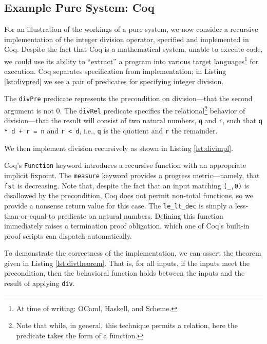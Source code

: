 \subsection{Example Pure System: Coq\label{sec:exPure}}
For an illustration of the workings of a pure system, we now  consider a recursive implementation of the integer division operator, specified and implemented in Coq.  Despite the fact that Coq is a mathematical system, unable to execute code, we could use its ability to ``extract'' a program into various target languages\footnote{At time of writing: OCaml, Haskell, and Scheme.} for execution.  Coq separates specification from implementation; in Listing \ref{lst:divpred} we see a pair of predicates for specifying integer division.



The \texttt{divPre} predicate represents the precondition on division---that the second argument is not 0.  The \texttt{divRel} predicate specifies the relational\footnote{Note that while, in general, this technique permits a relation, here the predicate takes the form of a function.} behavior of division---that the result will consist of two natural numbers, \texttt{q} and \texttt{r}, such that \texttt{q * d + r = n} and \texttt{r < d}, i.e., \texttt{q} is the quotient and \texttt{r} the remainder.

We then implement division recursively as shown in Listing \ref{lst:divimpl}.



Coq's \texttt{Function} keyword introduces a recursive function with an appropriate implicit fixpoint.  The \texttt{measure} keyword provides a progress metric---namely, that \texttt{fst} is decreasing.  Note that, despite the fact that an input matching \texttt{(\_,0)} is disallowed by the precondition, Coq does not permit non-total functions, so we provide a nonsense return value for this case.  The \texttt{le\_lt\_dec} is simply a less-than-or-equal-to predicate on natural numbers. Defining this function immediately raises a termination proof obligation, which one of Coq's built-in proof scripts can dispatch automatically.

To demonstrate the correctness of the implementation, we can assert the theorem given in Listing \ref{lst:divtheorem}.  That is, for all inputs, if the inputs meet the precondition, then the behavioral function holds between the inputs and the result of applying \texttt{div}.

